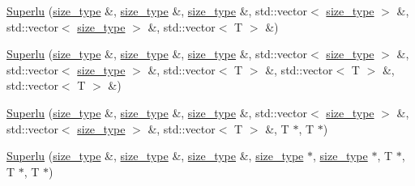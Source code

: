 \begin{DoxyCompactItemize}
\item 
\hyperlink{classlmx_1_1Superlu_a21b3e8cc15b7b533e64d2efccec9e9ef}{Superlu} (\hyperlink{lmx__mat__data_8h_a49b489a408a211a90e766329c0732d7b}{size\-\_\-type} \&, \hyperlink{lmx__mat__data_8h_a49b489a408a211a90e766329c0732d7b}{size\-\_\-type} \&, \hyperlink{lmx__mat__data_8h_a49b489a408a211a90e766329c0732d7b}{size\-\_\-type} \&, std\-::vector$<$ \hyperlink{lmx__mat__data_8h_a49b489a408a211a90e766329c0732d7b}{size\-\_\-type} $>$ \&, std\-::vector$<$ \hyperlink{lmx__mat__data_8h_a49b489a408a211a90e766329c0732d7b}{size\-\_\-type} $>$ \&, std\-::vector$<$ T $>$ \&)
\item 
\hyperlink{classlmx_1_1Superlu_a1120b63d96216983b6708564a50681eb}{Superlu} (\hyperlink{lmx__mat__data_8h_a49b489a408a211a90e766329c0732d7b}{size\-\_\-type} \&, \hyperlink{lmx__mat__data_8h_a49b489a408a211a90e766329c0732d7b}{size\-\_\-type} \&, \hyperlink{lmx__mat__data_8h_a49b489a408a211a90e766329c0732d7b}{size\-\_\-type} \&, std\-::vector$<$ \hyperlink{lmx__mat__data_8h_a49b489a408a211a90e766329c0732d7b}{size\-\_\-type} $>$ \&, std\-::vector$<$ \hyperlink{lmx__mat__data_8h_a49b489a408a211a90e766329c0732d7b}{size\-\_\-type} $>$ \&, std\-::vector$<$ T $>$ \&, std\-::vector$<$ T $>$ \&, std\-::vector$<$ T $>$ \&)
\item 
\hyperlink{classlmx_1_1Superlu_a2b2959dbac2e0a28b825562b9e22b843}{Superlu} (\hyperlink{lmx__mat__data_8h_a49b489a408a211a90e766329c0732d7b}{size\-\_\-type} \&, \hyperlink{lmx__mat__data_8h_a49b489a408a211a90e766329c0732d7b}{size\-\_\-type} \&, \hyperlink{lmx__mat__data_8h_a49b489a408a211a90e766329c0732d7b}{size\-\_\-type} \&, std\-::vector$<$ \hyperlink{lmx__mat__data_8h_a49b489a408a211a90e766329c0732d7b}{size\-\_\-type} $>$ \&, std\-::vector$<$ \hyperlink{lmx__mat__data_8h_a49b489a408a211a90e766329c0732d7b}{size\-\_\-type} $>$ \&, std\-::vector$<$ T $>$ \&, T $\ast$, T $\ast$)
\item 
\hyperlink{classlmx_1_1Superlu_aa1a7e499e4e69e7ae9abaf9613ef955d}{Superlu} (\hyperlink{lmx__mat__data_8h_a49b489a408a211a90e766329c0732d7b}{size\-\_\-type} \&, \hyperlink{lmx__mat__data_8h_a49b489a408a211a90e766329c0732d7b}{size\-\_\-type} \&, \hyperlink{lmx__mat__data_8h_a49b489a408a211a90e766329c0732d7b}{size\-\_\-type} \&, \hyperlink{lmx__mat__data_8h_a49b489a408a211a90e766329c0732d7b}{size\-\_\-type} $\ast$, \hyperlink{lmx__mat__data_8h_a49b489a408a211a90e766329c0732d7b}{size\-\_\-type} $\ast$, T $\ast$, T $\ast$, T $\ast$)
\item 

\end{DoxyCompactItemize}
